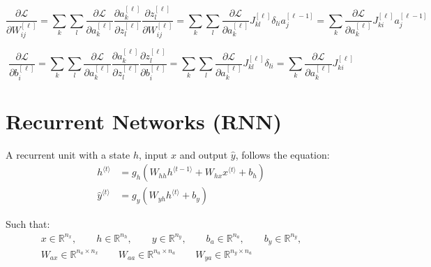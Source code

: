 \documentclass[a4paper, 12pt]{report}
\begin{document}
\begin{equation}
\frac{\partial\mathcal L}{\partial W_{ij}^{[\ell]}}
=\sum_{k}\sum_l\frac{\partial\mathcal L}{\partial a_k^{[\ell]}}\frac{\partial a_k^{[\ell]}}{\partial z_l^{[\ell]}}\frac{\partial z_l^{[\ell]}}{\partial W_{ij}^{[\ell]}}
=\sum_k\sum_l\frac{\partial\mathcal L}{\partial a_k^{[\ell]}} J_{kl}^{[\ell]}\delta_{li}a_j^{[\ell-1]}
= \sum_k\frac{\partial\mathcal L}{\partial a_k^{[\ell]}} J_{ki}^{[\ell]} a_j^{[\ell-1]}
\end{equation}

\begin{equation}
\frac{\partial\mathcal L}{\partial b_i^{[\ell]}}
=\sum_{k}\sum_l\frac{\partial\mathcal L}{\partial a_k^{[\ell]}}\frac{\partial a_k^{[\ell]}}{\partial z_l^{[\ell]}}\frac{\partial z_l^{[\ell]}}{\partial b_i^{[\ell]}}
=\sum_k\sum_l\frac{\partial\mathcal L}{\partial a_k^{[\ell]}} J_{kl}^{[\ell]}\delta_{li}
= \sum_k\frac{\partial\mathcal L}{\partial a_k^{[\ell]}} J_{ki}^{[\ell]}
\end{equation}



\newpage
\section{Recurrent Networks (RNN)}
A recurrent unit with a state $h$, input $x$ and output $\hat y$, follows the equation:
\begin{equation}
\begin{array}{ll}
h^{\langle t\rangle} &= g_h\left(W_{hh} h^{\langle t-1\rangle} + W_{hx} x^{\langle t\rangle} + b_h\right) \\
\hat y^{\langle t\rangle} &= g_y \left(W_{yh} h^{\langle t\rangle} + b_y\right)
\end{array}
\end{equation}

Such that:
\begin{equation}
\begin{array}{c}
x\in\mathbb{R}^{n_x},\quad\quad
h\in\mathbb{R}^{n_h},\quad\quad
y\in\mathbb{R}^{n_y},\quad\quad
b_a\in\mathbb{R}^{n_a},\quad\quad
b_y\in\mathbb{R}^{n_y},\quad\quad
\\
W_{ax}\in\mathbb{R}^{n_a\times n_x}\quad\quad
W_{aa}\in\mathbb{R}^{n_a\times n_a}\quad\quad
W_{ya}\in\mathbb{R}^{n_y\times n_a}\quad\quad
\\
\end{array}
\end{equation}
\end{document}
